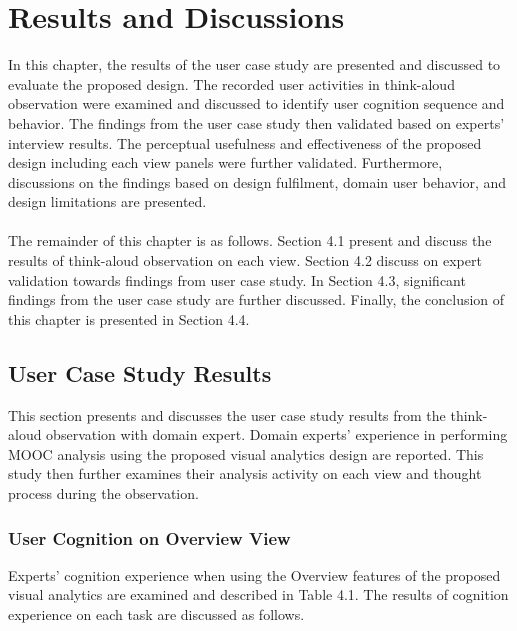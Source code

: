 
\chapter{Results and Discussions}

In this chapter, the results of the user case study are presented and discussed to evaluate the proposed design. The recorded user activities in think-aloud observation were examined and discussed to identify user cognition sequence and behavior. The findings from the user case study then validated based on experts’ interview results. The perceptual usefulness and effectiveness of the proposed design including each view panels were further validated. Furthermore, discussions on the findings based on design fulfilment, domain user behavior, and design limitations are presented.
\\ \\ \indent
The remainder of this chapter is as follows. Section 4.1 present and discuss the results of think-aloud observation on each view. Section 4.2 discuss on expert validation towards findings from user case study. In Section 4.3, significant findings from the user case study are further discussed. Finally, the conclusion of this chapter is presented in Section 4.4.

\section{User Case Study Results}
This section presents and discusses the user case study results from the think-aloud observation with domain expert. Domain experts’ experience in performing MOOC analysis using the proposed visual analytics design are reported. This study then further examines their analysis activity on each view and thought process during the observation.

\subsection{User Cognition on Overview View}
Experts’ cognition experience when using the Overview features of the proposed visual analytics are examined and described in Table 4.1. The results of cognition experience on each task are discussed as follows.

